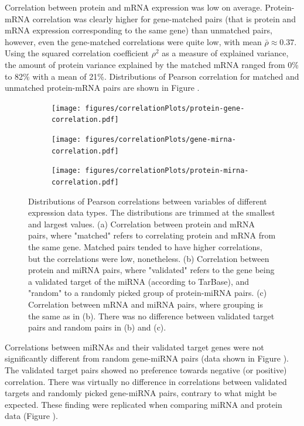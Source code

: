 Correlation between protein and mRNA expression was low on average. Protein-
mRNA correlation was clearly higher for gene-matched pairs (that is protein
and mRNA expression corresponding to the same gene) than unmatched pairs,
however, even the gene-matched correlations were quite low, with mean
$\bar{\rho} \approx 0.37$. Using the squared correlation coefficient $\rho^2$
as a measure of explained variance, the amount of protein variance explained
by the matched mRNA ranged from 0\% to 82\% with a mean of 21\%. Distributions
of Pearson correlation for matched and unmatched protein-mRNA pairs are shown
in Figure \label{fig:protein-gene-cor}.

\begin{figure}[!h]
  \centering
  \begin{subfigure}{.45\textwidth}
    \subcaption{ \label{fig:protein-gene-cor}}
    \centering
    \texttt{[image: figures/correlationPlots/protein-gene-correlation.pdf]}
  \end{subfigure}
  \begin{subfigure}{.45\textwidth}
    \subcaption{ \label{fig:gene-mirna-cor}}
    \texttt{[image: figures/correlationPlots/gene-mirna-correlation.pdf]}
  \end{subfigure}
  \begin{subfigure}{.45\textwidth}
    \subcaption{ \label{fig:protein-mirna-cor}}
    \centering
    \texttt{[image: figures/correlationPlots/protein-mirna-correlation.pdf]}
  \end{subfigure}

  \caption{Distributions of Pearson correlations between variables of different expression data types.
  The distributions are trimmed at the smallest and largest values.
  (a) Correlation between protein and mRNA pairs, where "matched" refers to correlating
  protein and mRNA from the same gene. Matched pairs tended to have higher correlations, but
  the correlations were low, nonetheless.
  (b) Correlation between protein and miRNA pairs, where "validated" refers to the gene
  being a validated target of the miRNA (according to TarBase),
  and "random" to a randomly picked group of protein-miRNA pairs.
  (c) Correlation between mRNA and miRNA pairs,
  where grouping is the same as in (b). There was no difference between
  validated target pairs and random pairs in (b) and (c).}
  \label{fig:correlations}
\end{figure}

Correlations between miRNAs and their validated target genes were not
significantly different from random gene-miRNA pairs (data shown in
Figure \label{fig:gene-mirna-cor}).
The validated target pairs showed no preference towards negative (or positive)
correlation. There was virtually no difference in correlations between validated
targets and randomly picked gene-miRNA pairs, contrary to what might be
expected. These finding were replicated when comparing miRNA and protein data
(Figure \label{fig:protein-mirna-cor}).




